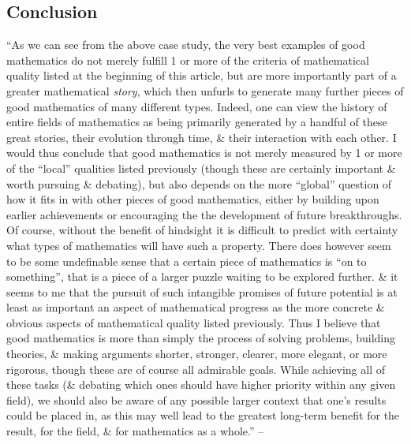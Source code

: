 \documentclass[oneside]{book}
\numberwithin{equation}{section}
\begin{document}
\subsection{Conclusion}
``As we can see from the above case study, the very best examples of good mathematics do not merely fulfill 1 or more of the criteria of mathematical quality listed at the beginning of this article, but are more importantly part of a greater mathematical \textit{story}, which then unfurls to generate many further pieces of good mathematics of many different types. Indeed, one can view the history of entire fields of mathematics as being primarily generated by a handful of these great stories, their evolution through time, \& their interaction with each other. I would thus conclude that good mathematics is not merely measured by 1 or more of the ``local'' qualities listed previously (though these are certainly important \& worth pursuing \& debating), but also depends on the more ``global'' question of how it fits in with other pieces of good mathematics, either by building upon earlier achievements or encouraging the the development of future breakthroughs. Of course, without the benefit of hindsight it is difficult to predict with certainty what types of mathematics will have such a property. There does however seem to be some undefinable sense that a certain piece of mathematics is ``on to something'', that is a piece of a larger puzzle waiting to be explored further. \& it seems to me that the pursuit of such intangible promises of future potential is at least as important an aspect of mathematical progress as the more concrete \& obvious aspects of mathematical quality listed previously. Thus I believe that good mathematics is more than simply the process of solving problems, building theories, \& making arguments shorter, stronger, clearer, more elegant, or more rigorous, though these are of course all admirable goals. While achieving all of these tasks (\& debating which ones should have higher priority within any given field), we should also be aware of any possible larger context that one's results could be placed in, as this may well lead to the greatest long-term benefit for the result, for the field, \& for mathematics as a whole.'' -- \cite[pp. 632--633]{Tao2007}


\printbibliography[heading=bibintoc]
	
\end{document}
